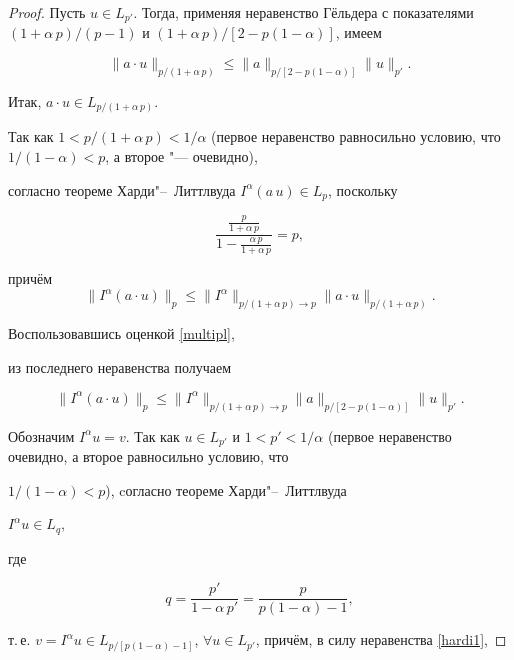\begin{proof}

Пусть $u\in L_{p'}$. Тогда, применяя неравенство Гёльдера с показателями $(1+\alpha\,p)/(p-1)$ и $(1+\alpha\,p)/[2-p(1-\alpha)]$, имеем

\begin{equation}

\label{multipl} \|a\cdot u\|_{p/(1+\alpha\,p)}\leq

\|a\|_{p/[2-p(1-\alpha)]}\|u\|_{p'}.

\end{equation}

Итак, $a\cdot u\in L_{p/(1+\alpha\,p)}$. 

Так как $1<p/(1+\alpha\,p)<1/\alpha$ (первое неравенство равносильно условию, что $1/(1-\alpha)<p$, а второе "--- очевидно), 

согласно теореме Харди"--~Литтлвуда $I^\alpha(a\,u)\in L_p$, поскольку

$${\frac{\frac{p}{1+\alpha\,p}}{1-\frac{\alpha\,p}{1+\alpha\,p}}=p},$$

причём $$\|I^\alpha(a\cdot u)\|_p\leq

\|I^\alpha\|_{p/(1+\alpha\,p)\to p}\|a\cdot

u\|_{p/(1+\alpha\,p)}.$$ 

Воспользовавшись оценкой \eqref{multipl},

из последнего неравенства получаем

\begin{equation}

\label{hardi2}

\|I^\alpha(a\cdot u)\|_p\leq \|I^\alpha\|_{p/(1+\alpha\,p)\to p}\|a\|_{p/[2-p(1-\alpha)]}\|u\|_{p'} .

\end{equation}



Обозначим $I^\alpha u=v$. Так как $u\in L_{p'}$ и $1<p'<1/\alpha$ (первое неравенство очевидно, а второе равносильно условию, что

$1/(1-\alpha)<p$), cогласно теореме Харди"--~Литтлвуда

$I^\alpha u\in L_q$, 

где

$${q=\frac{p'}{1-\alpha\,p'}=\frac{p}{p(1-\alpha)-1}},$$

т.\,е. $v=I^\alpha u\in L_{p/[p(1-\alpha)-1]}$, $\forall u\in

L_{p'}$, причём, в силу неравенства \eqref{hardi1},


\end{proof}
